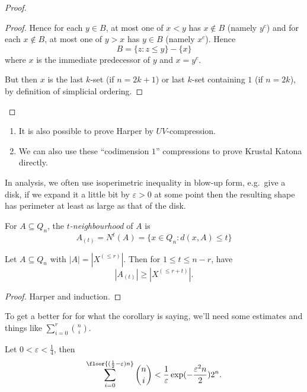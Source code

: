 \documentclass[a4paper]{article}
\begin{document}
\begin{proof}
\begin{proof}
    Hence for each \(y \in B\), at most one of \(x < y\) has \(x \notin B\) (namely \(y^c\)) and for each \(x \notin B\), at most one of \(y > x\) has \(y \in B\) (namely \(x^c\)). Hence
    \[
      B = \{z: z \leq y\} - \{x\}
    \]
    where \(x\) is the immediate predecessor of \(y\) and \(x = y^c\).

    But then \(x\) is the last \(k\)-set (if \(n = 2k + 1\)) or last \(k\)-set containing \(1\) (if \(n = 2k\)), by definition of simplicial ordering.
  \end{proof}
\end{proof}

\begin{remark}\leavevmode
  \begin{enumerate}
  \item It is also possible to prove Harper by \(UV\)-compression.
  \item We can also use these ``codimension \(1\)'' compressions to prove Krustal Katona directly.
  \end{enumerate}
\end{remark}

In analysis, we often use isoperimetric inequality in blow-up form, e.g.\ give a disk, if we expand it a little bit by \(\varepsilon > 0\) at some point then the resulting shape has perimeter at least as large as that of the disk.

\begin{definition}[\(t\)-neighbourhood]
  For \(A \subseteq Q_n\), the \emph{\(t\)-neighbourhood} of \(A\) is
  \[
    A_{(t)} = N^t(A) = \{x \in Q_n: d(x, A) \leq t\}
  \]
\end{definition}

\begin{corollary}
  Let \(A \subseteq Q_n\) with \(|A| = |X^{(\leq r)}|\). Then for \(1 \leq t \leq n - r\), have
  \[
    |A_{(t)}| \geq |X^{(\leq r + t)}|.
  \]
\end{corollary}

\begin{proof}
  Harper and induction.
\end{proof}

To get a better for for what the corollary is saying, we'll need some estimates and things like \(\sum_{i = 0}^r \binom{n}{i}\).

\begin{proposition}
  Let \(0 < \varepsilon < \frac{1}{4}\), then
  \[
    \sum_{i = 0}^{\floor{(\frac{1}{2} - \varepsilon) n}} \binom{n}{i} < \frac{1}{\varepsilon} \exp (- \frac{\varepsilon^2 n}{2}) 2^n.
  \]
\end{proposition}
\end{document}
